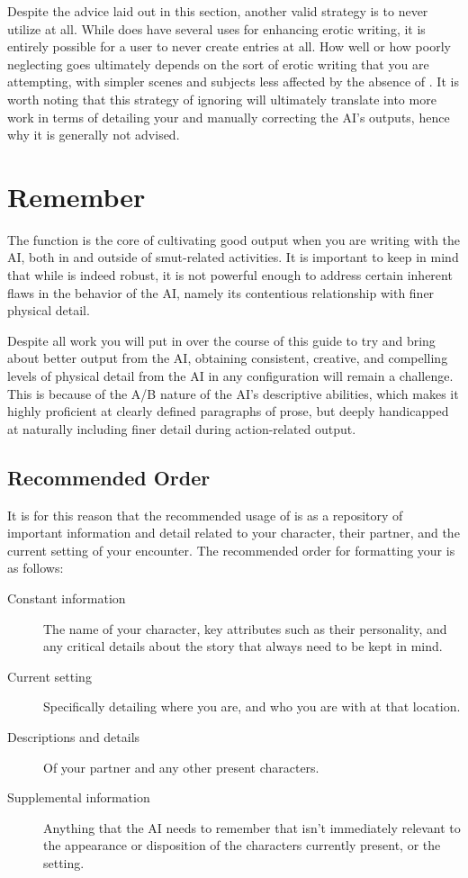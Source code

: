 \documentclass[Source-main.tex]{subfiles}
\begin{document}
Despite the advice laid out in this section, another valid strategy is to never utilize \wi at all.
While \wi does have several uses for enhancing erotic writing, it is entirely possible for a user to never create \wi entries at all.
How well or how poorly neglecting \wi goes ultimately depends on the sort of erotic writing that you are attempting, with simpler scenes and subjects less affected by the absence of \wi.
It is worth noting that this strategy of ignoring \wi will ultimately translate into more work in terms of detailing your \rem and manually correcting the AI’s outputs, hence why it is generally not advised.

\chapter{Remember}
\label{ch:remember}

The \rem function is the core of cultivating good output when you are writing with the AI, both in and outside of smut-related activities.
It is important to keep in mind that while \rem is indeed robust, it is not powerful enough to address certain inherent flaws in the behavior of the AI, namely its contentious relationship with finer physical detail.

Despite all work you will put in over the course of this guide to try and bring about better output from the AI, obtaining consistent, creative, and compelling levels of physical detail from the AI in any configuration will remain a challenge.
This is because of the A/B nature of the AI’s descriptive abilities, which makes it highly proficient at clearly defined paragraphs of prose, but deeply handicapped at naturally including finer detail during action-related output.

\section{Recommended Order}
\label{sec:recomorder}

It is for this reason that the recommended usage of \rem is as a repository of important information and detail related to your character, their partner, and the current setting of your encounter.
The recommended order for formatting your \rem is as follows:

\begin{description}

\item[Constant information]
	The name of your character, key attributes such as their personality, and any critical details about the story that always need to be kept in mind.
\item[Current setting]
	Specifically detailing where you are, and who you are with at that location.
\item[Descriptions and details]
	Of your partner and any other present characters.
\item[Supplemental information]
	Anything that the AI needs to remember that isn’t immediately relevant to the appearance or disposition of the characters currently present, or the setting.

\end{description}
\end{document}
